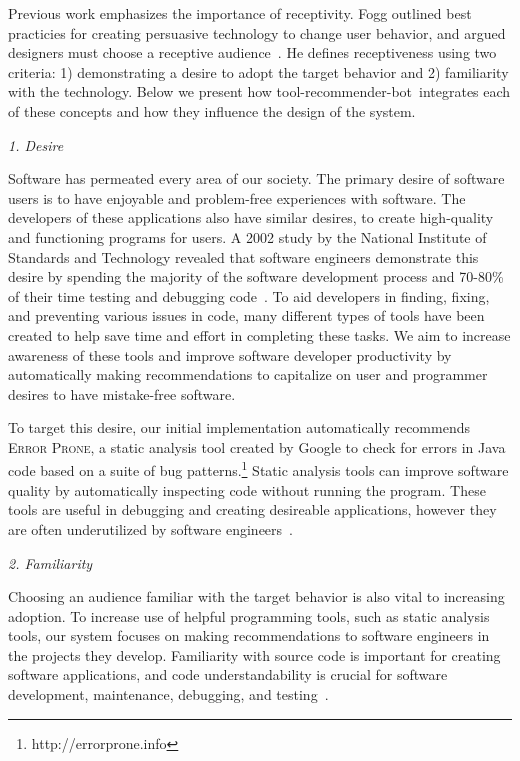 \documentclass[conference]{IEEEtran}
\newcommand{\tool}{tool-recommender-bot}
\newcommand{\pseudosection}[1]{\vspace{2mm} \noindent {\bf #1}}
\newcommand{\pseudosubsection}[1]{\vspace{2mm} {\it #1}}
\begin{document}
\pseudosection{Receptiveness}

Previous work emphasizes the importance of receptivity. Fogg outlined best practicies for creating persuasive technology to change user behavior, and argued designers must choose a receptive audience~\cite{FoggPersuasive}. He defines receptiveness using two criteria: 1) demonstrating a desire to adopt the target behavior and 2) familiarity with the technology. Below we present how \tool~integrates each of these concepts and how they influence the design of the system.

\pseudosubsection{1. Desire}

Software has permeated every area of our society. The primary desire of software users is to have enjoyable and problem-free experiences with software. The developers of these applications also have similar desires, to create high-quality and functioning programs for users. A 2002 study by the National Institute of Standards and Technology revealed that software engineers demonstrate this desire by spending the majority of the software development process and 70-80\% of their time testing and debugging code~\cite{NIST}. To aid developers in finding, fixing, and preventing various issues in code, many different types of tools have been created to help save time and effort in completing these tasks. We aim to increase awareness of these tools and improve software developer productivity by automatically making recommendations to capitalize on user and programmer desires to have mistake-free software.

To target this desire, our initial implementation automatically recommends \textsc{Error Prone}, a static analysis tool created by Google to check for errors in Java code based on a suite of bug patterns.\footnote{http://errorprone.info} Static analysis tools can improve software quality by automatically inspecting code without running the program. These tools are useful in debugging and creating desireable applications, however they are often underutilized by software engineers~\cite{Johnson2013Why}. 

\pseudosubsection{2. Familiarity}

Choosing an audience familiar with the target behavior is also vital to increasing adoption. To increase use of helpful programming tools, such as static analysis tools, our system focuses on making recommendations to software engineers in the projects they develop. Familiarity with source code is important for creating software applications, and code understandability is crucial for software development,  maintenance, debugging, and testing~\cite{ASE}.
\end{document}
